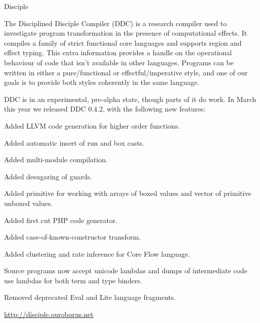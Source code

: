 \begin{hcarentry}[section]{Disciple}
\makeheader

The Disciplined Disciple Compiler (DDC) is a research compiler used to investigate program transformation in the presence of computational effects. It compiles a family of strict functional core languages and supports region and effect typing. This extra information provides a handle on the operational behaviour of code that isn't available in other languages. Programs can be written in either a pure/functional or effectful/imperative style, and one of our goals is to provide both styles coherently in the same language.

\WhatsNew

DDC is in an experimental, pre-alpha state, though parts of it do work. In March this year we released DDC 0.4.2, with the following new features:

\begin{compactitem}
\item Added LLVM code generation for higher order functions.
\item Added automatic insert of run and box casts.
\item Added multi-module compilation.
\item Added desugaring of guards.
\item Added primitive for working with arrays of boxed values and vector of primitive unboxed values.
\item Added first cut PHP code generator.
\item Added case-of-known-constructor transform.
\item Added clustering and rate inference for Core Flow language.
\item Source programs now accept unicode lambdas and dumps of intermediate code use lambdas
      for both term and type binders.
\item Removed deprecated Eval and Lite language fragments.
\end{compactitem}

\FurtherReading
  \url{http://disciple.ouroborus.net}
\end{hcarentry}
